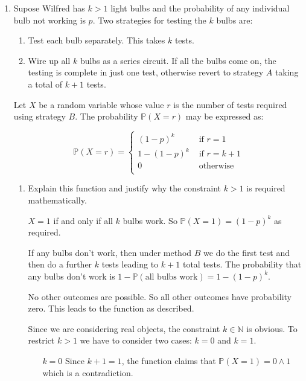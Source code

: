 \documentclass[10pt,\jkfside,a4paper]{article}
\begin{document}
\begin{enumerate}
\item
Supose Wilfred has $k > 1$ light bulbs and the probability of any individual
bulb not working is $p$.
Two strategies for testing the $k$ bulbs are:

\begin{enumerate}[label=(\Alph*)]

\item Test each bulb separately.
This takes $k$ tests.

\item Wire up all $k$ bulbs as a series circuit.
If all the bulbs come on, the testing is complete in just one test,
otherwise revert to strategy $A$ taking a total of $k + 1$ tests.

\end{enumerate}

Let $X$ be a random variable whose value $r$ is the number of tests required
using strategy $B$.
The probability $\mathbb{P}(X = r)$ may be expressed as:

\[
\mathbb{P}(X = r) =
\begin{cases}
(1 - p)^k & \text{ if } r = 1 \\
1 - (1 - p)^k & \text{ if } r = k + 1 \\
0 & \text{ otherwise } \\
\end{cases}
\]

\begin{enumerate}

\item Explain this function and justify why the constraint $k > 1$ is required
mathematically.

$X = 1$ if and only if all $k$ bulbs work.
So $\mathbb{P}(X = 1) = (1 - p)^k$ as required.

If any bulbs don't work, then under method $B$ we do the first test and then do a further $k$ tests
leading to $k + 1$ total tests.
The probability that any bulbs don't work is $1 - \mathbb{P}(\text{all bulbs work}) = 1 - (1 - p)^k$.

No other outcomes are possible. 
So all other outcomes have probability zero. 
This leads to the function as described.

Since we are considering real objects, the constraint $k \in \mathbb{N}$ is obvious. 
To restrict $k > 1$ we have to consider two cases: $k = 0$ and $k = 1$.

\begin{itemize}

\item [$k = 0$]
Since $k + 1 = 1$, the function claims that $\mathbb{P}(X = 1) = 0 \wedge 1$
which is a contradiction.


\end{itemize}
\end{enumerate}
\end{enumerate}
\end{document}
